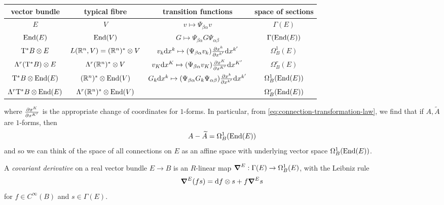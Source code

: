 \documentclass{article}
\begin{document}
\begin{center}
    \begin{tabular}{c c c c}
        vector bundle & typical fibre & transition functions & space of sections \\
        \hline
        \(E\) & \(V\) & \(v \mapsto \Psi_{\beta\alpha}v\) & \(\Gamma(E)\) \\
        \(\operatorname{End}(E)\) & \(\operatorname{End}(V)\) & \(G \mapsto \Psi_{\beta\alpha}G\Psi_{\alpha\beta}\) & \(\Gamma(\operatorname{End}(E))\) \\
        \(\mathrm{T}^*B \otimes E\) & \(L(\mathbb{R}^n, V) = (\mathbb{R}^n)^* \otimes V\) & \(v_k \dd x^k \mapsto (\Psi_{\beta\alpha}v_k) \pdv{x^k}{x^{k'}}\dd x^{k'}\) & \(\Omega^1_B(E)\) \\
        \(\Lambda^r(\mathrm{T}^* B) \otimes E\) & \(\Lambda^r(\mathbb{R}^n)^* \otimes V\) & \(v_K \dd x^K \mapsto (\Psi_{\beta\alpha}v_K) \pdv{x^K}{x^{K'}}\dd x^{K'}\) & \(\Omega_B^r(E)\) \\
        \(\mathrm{T}^*B \otimes \operatorname{End}(E)\) & \((\mathbb{R}^n)^* \otimes \operatorname{End}(V)\) & \(G_k \dd x^k \mapsto (\Psi_{\beta\alpha}G_k\Psi_{\alpha\beta})\pdv{x^k}{x^{k'}}\dd x^{k'}\) & \(\Omega^1_B(\operatorname{End}(E))\) \\
        \(\Lambda^r\mathrm{T}^*B \otimes \operatorname{End}(E)\) & \(\Lambda^r(\mathbb{R}^n)^* \otimes \operatorname{End}(V)\) & & \(\Omega^r_B(\operatorname{End}(E))\)
    \end{tabular}
\end{center}
where \(\pdv{x^K}{x^{K'}}\) is the appropriate change of coordinates for \(1\)-forms. In particular, from \cref{eq:connection-transformation-law}, we find that if \(A, \widetilde A\) are \(1\)-forms, then
\[A - \widetilde A = \Omega_B^1(\operatorname{End}(E))\]
and so we can think of the space of all connections on \(E\) as an affine space with underlying vector space \(\Omega_B^1(\operatorname{End}(E))\).

\begin{definition}
     A \emph{covariant derivative} on a real vector bundle \(E \to B\) is an \(R\)-linear map \(\grad^E : \Gamma(E) \to \Omega^1_B(E)\), with the Leibniz rule
    \[\grad^E(fs) = \dd f \otimes s + f \grad^E s\]
    for \(f \in C^\infty(B)\) and \(s \in \Gamma(E)\).
\end{definition}

\lec
\end{document}
